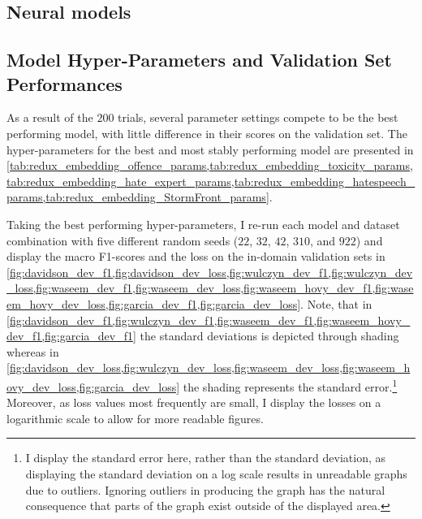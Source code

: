 \subsection{Neural models}
\subsection{Model Hyper-Parameters and Validation Set Performances}
As a result of the $200$ trials, several parameter settings compete to be the best performing model, with little difference in their scores on the validation set.
The hyper-parameters for the best and most stably performing model are presented in \cref{tab:redux_embedding_offence_params,tab:redux_embedding_toxicity_params,tab:redux_embedding_hate_expert_params,tab:redux_embedding_hatespeech_params,tab:redux_embedding_StormFront_params}.

Taking the best performing hyper-parameters, I re-run each model and dataset combination with five different random seeds ($22$, $32$, $42$, $310$, and $922$) and display the macro F1-scores and the loss on the in-domain validation sets in \cref{fig:davidson_dev_f1,fig:davidson_dev_loss,fig:wulczyn_dev_f1,fig:wulczyn_dev_loss,fig:waseem_dev_f1,fig:waseem_dev_loss,fig:waseem_hovy_dev_f1,fig:waseem_hovy_dev_loss,fig:garcia_dev_f1,fig:garcia_dev_loss}.
Note, that in \cref{fig:davidson_dev_f1,fig:wulczyn_dev_f1,fig:waseem_dev_f1,fig:waseem_hovy_dev_f1,fig:garcia_dev_f1} the standard deviations is depicted through shading whereas in \cref{fig:davidson_dev_loss,fig:wulczyn_dev_loss,fig:waseem_dev_loss,fig:waseem_hovy_dev_loss,fig:garcia_dev_loss} the shading represents the standard error.\footnote{I display the standard error here, rather than the standard deviation, as displaying the standard deviation on a log scale results in unreadable graphs due to outliers. Ignoring outliers in producing the graph has the natural consequence that parts of the graph exist outside of the displayed area.}
Moreover, as loss values most frequently are small, I display the losses on a logarithmic scale to allow for more readable figures.

